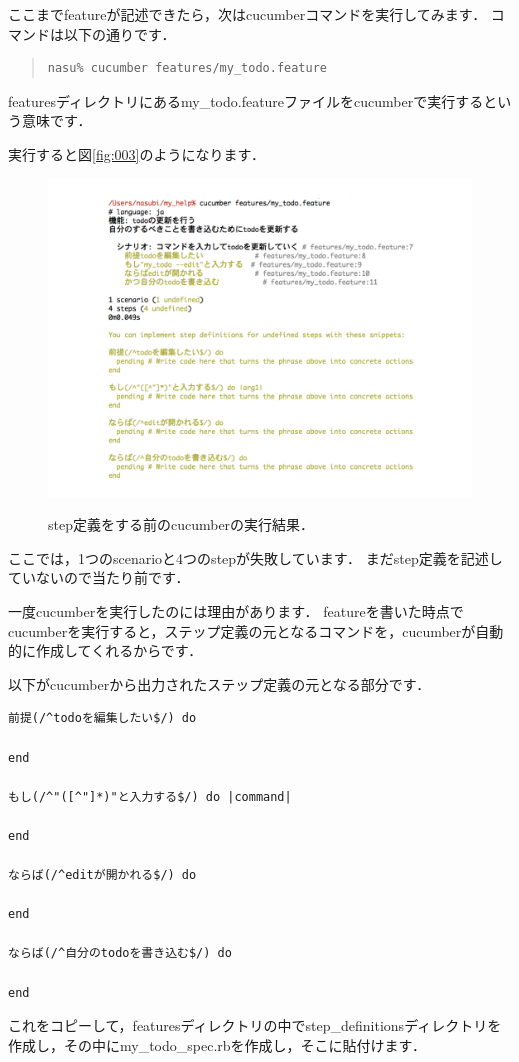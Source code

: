 ここまでfeatureが記述できたら，次はcucumberコマンドを実行してみます．
コマンドは以下の通りです．
\begin{quote}\begin{verbatim}
nasu% cucumber features/my_todo.feature
\end{verbatim}\end{quote}
featuresディレクトリにあるmy\_todo.featureファイルをcucumberで実行するという意味です．

実行すると図\ref{fig:003}のようになります．

\begin{figure}[htbp]\begin{center}
\includegraphics[width=12cm,bb= 0 0 937 753]{../figs/./my_help_nasu.003.jpeg}
\caption{step定義をする前のcucumberの実行結果．}
\label{fig:003}
\label{default}\end{center}\end{figure}
ここでは，1つのscenarioと4つのstepが失敗しています．
まだstep定義を記述していないので当たり前です．

一度cucumberを実行したのには理由があります．
featureを書いた時点でcucumberを実行すると，ステップ定義の元となるコマンドを，cucumberが自動的に作成してくれるからです．

以下がcucumberから出力されたステップ定義の元となる部分です．
\begin{lstlisting}[style=customCsh,basicstyle={\scriptsize\ttfamily}]
前提(/^todoを編集したい$/) do

end

もし(/^"([^"]*)"と入力する$/) do |command|

end

ならば(/^editが開かれる$/) do
  
end

ならば(/^自分のtodoを書き込む$/) do

end
\end{lstlisting}
これをコピーして，featuresディレクトリの中でstep\_definitionsディレクトリを作成し，その中にmy\_todo\_spec.rbを作成し，そこに貼付けます．

